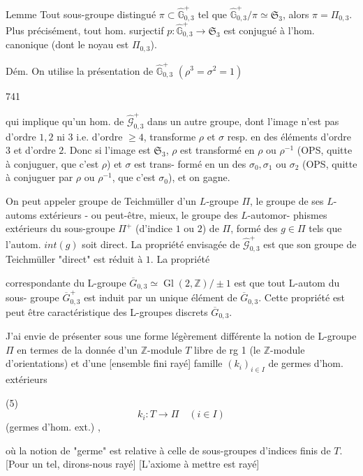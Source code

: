 Lemme Tout sous-groupe distingué $\pi \subset \widehat{\mathbb{G}}_{0,3}^+$ tel
que $\widehat{\mathbb{G}}_{0,3}^+ / \pi \simeq \mathfrak{S}_3$, alors $\pi = \Pi_{0,3}$.
Plus précisément, tout hom. surjectif
$p: \widehat{\mathbb{G}}_{0,3}^+ \to \mathfrak{S}_3$ est conjugué à l'hom.
canonique (dont le noyau est $\Pi_{0,3}$).

Dém. On utilise la présentation
de $\widehat{\mathbb{G}}_{0,3}^+$
$(\rho^3 = \sigma^2 = 1)$

\newpage


741

qui implique qu'un hom. de $\widehat{\mathcal{G}}_{0,3}^+$ dans
un autre groupe, dont l'image n'est pas
d'ordre $1, 2$ ni $3$ i.e. d'ordre $\ge 4$, transforme
$\rho$ et $\sigma$ resp. en des éléments d'ordre $3$
et d'ordre $2$. Donc si l'image est $\mathfrak{S}_3$,
$\rho$ est transformé en $\rho$ ou $\rho^{-1}$ (OPS, quitte
à conjuguer, que c'est $\rho$) et $\sigma$ est trans-
formé en un des $\sigma_0, \sigma_1$ ou $\sigma_2$ (OPS, quitte à
conjuguer par $\rho$ ou $\rho^{-1}$, que c'est $\sigma_0$), et
on gagne.

On peut appeler groupe de Teichmüller
d'un $L$-groupe $\Pi$, le groupe de ses
$L$-automs extérieurs - ou peut-être,
mieux, le groupe des $L$-automor-
phismes extérieurs du sous-groupe $\Pi^+$
(d'indice $1$ ou $2$) de $\Pi$, formé des
$g \in \Pi$ tels que l'autom. $int(g)$ soit
direct. La propriété envisagée de $\widehat{\mathcal{G}}_{0,3}^+$
est que son groupe de Teichmüller
"direct" est réduit à $1$. La propriété

\newpage


correspondante du L-groupe $\overline{G}_{0,3} \simeq \operatorname{Gl}(2, \mathbb{Z})/\pm 1$
est que tout L-autom du sous-
groupe $\overline{G}_{0,3}^+$ est induit par un unique
élément de $\overline{G}_{0,3}$. Cette propriété est
peut être caractéristique des L-groupes
discrets $\overline{G}_{0,3}$.

J'ai envie de présenter sous une
forme légèrement différente la notion
de L-groupe $\Pi$ en termes de la
donnée d'un $\mathbb{Z}$-module $T$
libre de rg 1 (le $\mathbb{Z}$-module
d'orientations) et d'une [ensemble fini rayé] famille
$(k_i)_{i \in I}$ de germes d'hom. extérieurs

(5) $$k_i : T \longrightarrow \Pi \quad (i \in I)$$
(germes d'hom. ext.) ,

où la notion de "germe" est relative
à celle de sous-groupes d'indices finis
de $T$. [Pour un tel, dirons-nous rayé]
[L'axiome à mettre est rayé]

